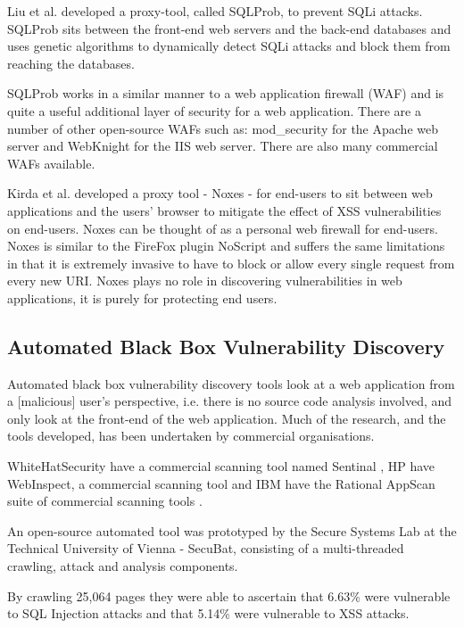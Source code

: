 \documentclass[12pt,a4paper]{article}
\begin{document}
Liu et al. developed  a proxy-tool, called SQLProb, to prevent SQLi attacks.  SQLProb sits between the front-end web servers and the back-end databases and uses genetic algorithms to dynamically detect SQLi attacks and block them from reaching the databases. \cite{Liu2009}

SQLProb works in a similar manner to a web application firewall (WAF) and is quite a useful additional layer of security for a web application.  There are a number of other open-source WAFs such as: mod\_security for the Apache web server \cite{ModSecurity:2010:Online} and WebKnight for the IIS web server. \cite{WebKnight:2010:Online}  There are also many commercial WAFs available.

Kirda et al. developed a proxy tool - Noxes - for end-users to sit between  web applications and the users’ browser to mitigate the effect of XSS vulnerabilities on end-users.  Noxes can be thought of as a personal web firewall for end-users. \cite{Kirda2006} Noxes is similar to the FireFox plugin NoScript \cite{NoScript:2010:Online} and suffers the same limitations in that it is extremely invasive to have to block or allow every single request from every new URI.  Noxes plays no role in discovering vulnerabilities in web applications, it is purely for protecting end users.

\subsection{Automated Black Box Vulnerability Discovery}
Automated black box vulnerability discovery tools look at a web application from a [malicious] user’s perspective, i.e. there is no source code analysis involved, and only look at the front-end of the web application.  Much of the research, and the tools developed, has been undertaken by commercial organisations.

WhiteHatSecurity have a commercial scanning tool named Sentinal \cite{WhiteHatSecurity:2010:Online}, HP have WebInspect, a commercial scanning tool \cite{HPWebInspect:2010:Online} and IBM have the Rational AppScan suite of commercial scanning tools \cite{IBM:2010:Online}. 

An open-source automated tool was prototyped by the Secure Systems Lab at the Technical University of Vienna - SecuBat, consisting of a multi-threaded crawling, attack and analysis components.   

By crawling 25,064 pages they were able to ascertain that 6.63\% were vulnerable to SQL Injection attacks and that 5.14\% were vulnerable to XSS attacks. \cite{Kals2006}
\end{document}
